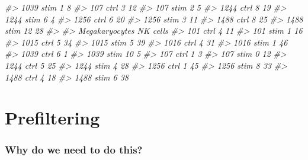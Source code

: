 \documentclass[
]{book}
\newenvironment{Shaded}{\begin{snugshade}}{\end{snugshade}}
\newcommand{\CommentTok}[1]{\textcolor[rgb]{0.56,0.35,0.01}{\textit{#1}}}
\begin{document}
\begin{Shaded}
\begin{Highlighting}[]
\CommentTok{\#\textgreater{}   1039 stim               1                 8}
\CommentTok{\#\textgreater{}   107 ctrl                3                12}
\CommentTok{\#\textgreater{}   107 stim                2                 5}
\CommentTok{\#\textgreater{}   1244 ctrl               8                19}
\CommentTok{\#\textgreater{}   1244 stim               6                 4}
\CommentTok{\#\textgreater{}   1256 ctrl               6                20}
\CommentTok{\#\textgreater{}   1256 stim               3                11}
\CommentTok{\#\textgreater{}   1488 ctrl               8                25}
\CommentTok{\#\textgreater{}   1488 stim              12                28}
\CommentTok{\#\textgreater{}            }
\CommentTok{\#\textgreater{}             Megakaryocytes NK cells}
\CommentTok{\#\textgreater{}   101 ctrl               4       11}
\CommentTok{\#\textgreater{}   101 stim               1       16}
\CommentTok{\#\textgreater{}   1015 ctrl              5       34}
\CommentTok{\#\textgreater{}   1015 stim              5       39}
\CommentTok{\#\textgreater{}   1016 ctrl              4       31}
\CommentTok{\#\textgreater{}   1016 stim              1       46}
\CommentTok{\#\textgreater{}   1039 ctrl              6        1}
\CommentTok{\#\textgreater{}   1039 stim             10        5}
\CommentTok{\#\textgreater{}   107 ctrl               1        3}
\CommentTok{\#\textgreater{}   107 stim               0       12}
\CommentTok{\#\textgreater{}   1244 ctrl              5       25}
\CommentTok{\#\textgreater{}   1244 stim              4       28}
\CommentTok{\#\textgreater{}   1256 ctrl              1       45}
\CommentTok{\#\textgreater{}   1256 stim              8       33}
\CommentTok{\#\textgreater{}   1488 ctrl              4       18}
\CommentTok{\#\textgreater{}   1488 stim              6       38}
\end{Highlighting}
\end{Shaded}

\hypertarget{prefiltering}{%
\section{Prefiltering}\label{prefiltering}}

\hypertarget{why-do-we-need-to-do-this-7}{%
\subsubsection*{Why do we need to do this?}\label{why-do-we-need-to-do-this-7}}
\end{document}
